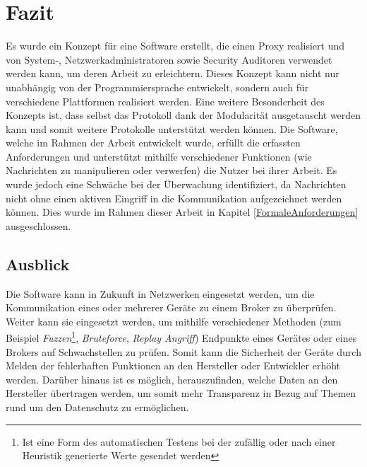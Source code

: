 \chapter{Fazit}
Es wurde ein Konzept für eine Software erstellt, die einen Proxy realisiert und von System-, Netzwerkadministratoren sowie Security Auditoren verwendet werden kann, um deren Arbeit zu erleichtern. Dieses Konzept kann nicht nur unabhängig von der Programmiersprache entwickelt, sondern auch für verschiedene Plattformen realisiert werden. Eine weitere Besonderheit des Konzepts ist, dass selbst das Protokoll dank der Modularität ausgetauscht werden kann und somit weitere Protokolle unterstützt werden können.
Die Software, welche im Rahmen der Arbeit entwickelt wurde, erfüllt die erfassten Anforderungen und unterstützt mithilfe verschiedener Funktionen (wie Nachrichten zu manipulieren oder verwerfen) die Nutzer bei ihrer Arbeit. Es wurde jedoch eine Schwäche bei der Überwachung identifiziert, da Nachrichten nicht ohne einen aktiven Eingriff in die Kommunikation aufgezeichnet werden können. Dies wurde im Rahmen dieser Arbeit in Kapitel \ref{FormaleAnforderungen} ausgeschlossen.


\section{Ausblick}
Die Software kann in Zukunft in Netzwerken eingesetzt werden, um die Kommunikation eines oder mehrerer Geräte zu einem Broker zu überprüfen.
Weiter kann sie eingesetzt werden, um mithilfe verschiedener Methoden (zum Beispiel \emph{Fuzzen}\footnote{Ist eine Form des automatischen Testens bei der zufällig oder nach einer Heuristik generierte Werte gesendet werden}, \emph{Bruteforce}, \emph{Replay Angriff}) Endpunkte eines Gerätes oder eines Brokers auf Schwachstellen zu prüfen. Somit kann die Sicherheit der Geräte durch Melden der fehlerhaften Funktionen an den Hersteller oder Entwickler erhöht werden. Darüber hinaus ist es möglich, herauszufinden, welche Daten an den Hersteller übertragen werden, um somit mehr Transparenz in Bezug auf Themen rund um den Datenschutz zu ermöglichen.

